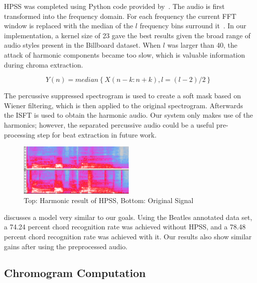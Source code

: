 \documentclass{article}
\begin{document}
HPSS was completed using Python code provided by~\cite{librosa:24}. The audio
is first transformed into the frequency domain. For each frequency the current
FFT window is replaced with the median of the $l$ frequency bins surround
it~\cite{FitzGerald:11}. In our implementation, a kernel size of 23 gave the
best results given the broad range of audio styles present in the Billboard
dataset. When $l$ was larger than 40, the attack of harmonic components became
too slow, which is valuable information during chroma extraction.

$$ Y(n) = median \left \{X(n-k:n+k),l = (l-2)/2  \right \} $$

The percussive suppressed spectrogram is used to create a soft mask based on
Wiener filtering, which is then applied to the original spectrogram. Afterwards
the ISFT is used to obtain the harmonic audio. Our system only makes use of the
harmonics; however, the  separated percussive audio could be a useful
pre-processing step for beat extraction in future work.

\begin{figure}
   \centering
    \includegraphics[width=0.5\textwidth]{hpssspec.png}
   \caption{Top: Harmonic result of HPSS, Bottom: Original Signal}\label{fig:HPSS}
\end{figure}


\cite{Ueda:19} discusses a model very similar to our goals. Using the
Beatles annotated data set, a 74.24 percent chord recognition rate was achieved
without HPSS, and a 78.48 percent chord recognition rate was achieved with it.
Our results also show similar gains after using the preprocessed audio.

\subsection{Chromogram Computation}
\end{document}
